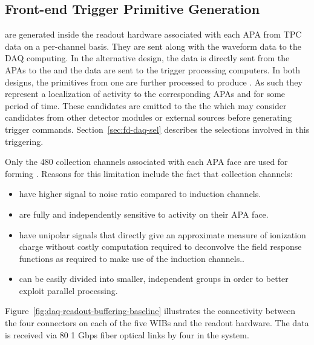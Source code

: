 
\subsection{Front-end Trigger Primitive Generation}
\label{sec:fd-daq-fetp}


 are generated inside the  readout
hardware associated with each APA from TPC data on a per-channel basis.
They are sent along with the waveform data to the  DAQ
computing.
In the alternative design, the data is directly sent from the APAs to
the  and the data are sent to the trigger processing
computers.  
In both designs, the primitives from one  are further
processed to produce . 
As such they represent a localization of activity to the corresponding
APAs and for some period of time. 
These candidates are emitted to the the  which may consider
candidates from other detector modules or external sources before
generating trigger commands.
Section~\ref{sec:fd-daq-sel} describes the selections involved in this
triggering.

Only the 480 collection channels associated with each APA face are
used for forming . 
Reasons for this limitation include the fact that collection
channels:

\begin{itemize}
\item have higher signal to noise ratio compared to induction channels.
\item are fully and independently sensitive to activity on their APA face.
\item have unipolar signals that directly give an approximate measure
  of ionization charge without costly computation required to
  deconvolve the field response functions as required to make use of
  the induction channels..
\item can be easily divided into smaller, independent groups in order
  to better exploit parallel processing.
\end{itemize}


Figure~\ref{fig:daq-readout-buffering-baseline} illustrates the connectivity between the
four connectors on each of the five WIBs and the  readout hardware.
The data is received via 80 1 Gbps fiber optical links by four 
in the   system. 

